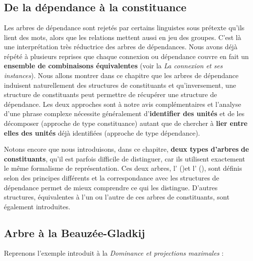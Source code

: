 \chapter{}\label{sec:3.4}

\section{De la dépendance à la constituance}\label{sec:3.4.0}

Les arbres de dépendance sont rejetés par certains linguistes sous prétexte qu’ils lient des mots, alors que les relations mettent aussi en jeu des groupes. C’est là une interprétation très réductrice des arbres de dépendances. Nous avons déjà répété à plusieurs reprises que chaque connexion ou dépendance couvre en fait un \textbf{ensemble de combinaisons équivalentes} (voir la  \textit{La connexion et ses instances}). Nous allons montrer dans ce chapitre que les arbres de dépendance induisent naturellement des structures de constituants et qu’inversement, une structure de constituants peut permettre de récupérer une structure de dépendance. Les deux approches sont à notre avis complémentaires et l’analyse d’une phrase complexe nécessite généralement d’\textbf{identifier des unités} et de les décomposer (approche de type constituance) autant que de chercher à \textbf{lier entre elles des unités} déjà identifiées (approche de type dépendance).

Notons encore que nous introduisons, dans ce chapitre, \textbf{deux types d’arbres} \textbf{de constituants}, qu’il est parfois difficile de distinguer, car ils utilisent exactement le même formalisme de représentation. Ces deux arbres, l’ ()\textstyleTermes{ }et l’ (), sont définis selon des principes différents et la correspondance avec les structures de dépendance permet de mieux comprendre ce qui les distingue. D’autres structures, équivalentes à l’un ou l’autre de ces arbres de constituants, sont également introduites.

\section{ Arbre à la Beauzée-Gladkij}\label{sec:3.4.1}

Reprenons l’exemple introduit à la  \textit{Dominance et projections maximales} :

